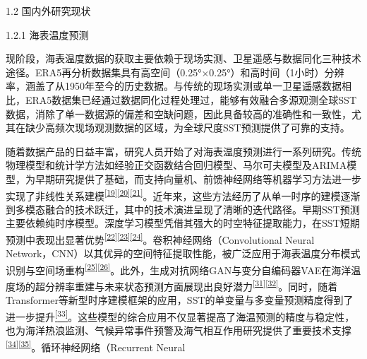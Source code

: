 \documentclass[
  12pt,
]{article}
\begin{document}
\protect{}\label{_Toc1760527634}{}1.2 国内外研究现状

\protect{}\label{_Toc1158256272}{}1.2.1 海表温度预测

现阶段，海表温度数据的获取主要依赖于现场实测、卫星遥感与数据同化三种技术途径。ERA5再分析数据集具有高空间（0.25°×0.25°）和高时间（1小时）分辨率，涵盖了从1950年至今的历史数据。与传统的现场实测或单一卫星遥感数据相比，ERA5数据集已经通过数据同化过程处理过，能够有效融合多源观测全球SST数据，消除了单一数据源的偏差和空缺问题，因此具备较高的准确性和一致性，尤其在缺少高频次现场观测数据的区域，为全球尺度SST预测提供了可靠的支持。

随着数据产品的日益丰富，研究人员开始了对海表温度预测进行一系列研究。传统物理模型和统计学方法如经验正交函数结合回归模型、马尔可夫模型及ARIMA模型，为早期研究提供了基础，而支持向量机、前馈神经网络等机器学习方法进一步实现了非线性关系建模\textsuperscript{\hyperref[_Ref165148613]{{[}19{]}}\hyperref[_Ref165148613]{{[}20{]}}\hyperref[_Ref165148613]{{[}21{]}}}。近年来，这些方法经历了从单一时序的建模逐渐到多模态融合的技术跃迁，其中的技术演进呈现了清晰的迭代路径。早期SST预测主要依赖纯时序模型。深度学习模型凭借其强大的时空特征提取能力，在SST短期预测中表现出显著优势\textsuperscript{\hyperref[_Ref165148613]{{[}22{]}}\hyperref[_Ref165148613]{{[}23{]}}\hyperref[_Ref165148613]{{[}24{]}}}。卷积神经网络（Convolutional
Neural
Network，CNN）以其优异的空间特征提取性能，被广泛应用于海表温度分布模式识别与空间场重构\textsuperscript{\hyperref[_Ref165148613]{{[}25{]}}\hyperref[_Ref165148613]{{[}26{]}}}。此外，生成对抗网络GAN与变分自编码器VAE在海洋温度场的超分辨率重建与未来状态预测方面展现出良好潜力\textsuperscript{\hyperref[_Ref165148613]{{[}31{]}}\hyperref[_Ref165148613]{{[}32{]}}}。同时，随着Transformer等新型时序建模框架的应用，SST的单变量与多变量预测精度得到了进一步提升\hyperref[_Ref165148613]{\textsuperscript{{[}33{]}}}。这些模型的综合应用不仅显著提高了海温预测的精度与稳定性，也为海洋热浪监测、气候异常事件预警及海气相互作用研究提供了重要技术支撑\textsuperscript{\hyperref[_Ref165148613]{{[}34{]}}\hyperref[_Ref165148613]{{[}35{]}}}。循环神经网络（Recurrent
Neural
\end{document}

